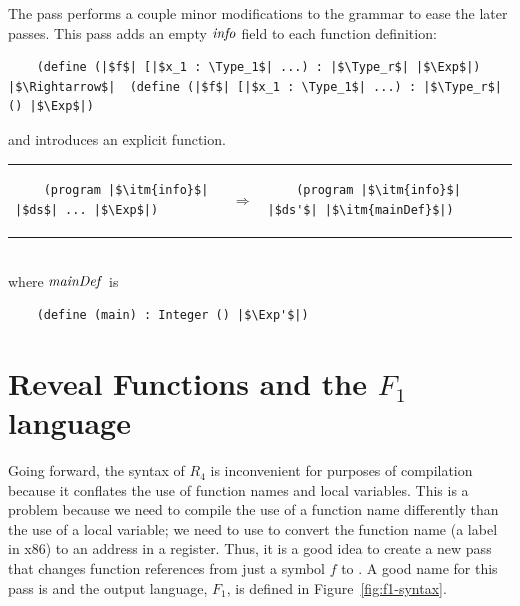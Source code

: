 \documentclass[11pt]{book}
\begin{document}
The  pass performs a couple minor modifications to the
grammar to ease the later passes. This pass adds an empty $\mathit{info}$
field to each function definition:
\begin{lstlisting}
    (define (|$f$| [|$x_1 : \Type_1$| ...) : |$\Type_r$| |$\Exp$|)
|$\Rightarrow$|  (define (|$f$| [|$x_1 : \Type_1$| ...) : |$\Type_r$| () |$\Exp$|)
\end{lstlisting}
and introduces an explicit  function.\\
\begin{tabular}{lll}
\begin{minipage}{0.45\textwidth}
\begin{lstlisting}
    (program |$\itm{info}$| |$ds$| ... |$\Exp$|)
\end{lstlisting}
\end{minipage}
&
$\Rightarrow$
&
\begin{minipage}{0.45\textwidth}
\begin{lstlisting}
    (program |$\itm{info}$| |$ds'$| |$\itm{mainDef}$|)
\end{lstlisting}
\end{minipage}
\end{tabular}  \\
where $\mathit{mainDef}$ is
\begin{lstlisting}
    (define (main) : Integer () |$\Exp'$|)
\end{lstlisting}


\section{Reveal Functions and the $F_1$ language}
\label{sec:reveal-functions-r4}

Going forward, the syntax of $R_4$ is inconvenient for purposes of
compilation because it conflates the use of function names and local
variables. This is a problem because we need to compile the use of a
function name differently than the use of a local variable; we need to
use  to convert the function name (a label in x86) to an
address in a register.  Thus, it is a good idea to create a new pass
that changes function references from just a symbol $f$ to
. A good name for this pass is
 and the output language, $F_1$, is defined in
Figure~\ref{fig:f1-syntax}.
\end{document}
